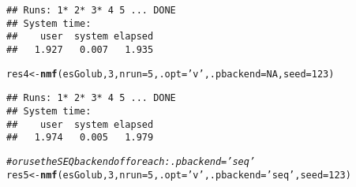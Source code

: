 \documentclass[a4paper]{article}\usepackage[]{graphicx}\usepackage[]{color}
\makeatletter
\newcommand{\hlnum}[1]{\textcolor[rgb]{0.686,0.059,0.569}{#1}}%
\newcommand{\hlstr}[1]{\textcolor[rgb]{0.192,0.494,0.8}{#1}}%
\newcommand{\hlcom}[1]{\textcolor[rgb]{0.678,0.584,0.686}{\textit{#1}}}%
\newcommand{\hlstd}[1]{\textcolor[rgb]{0.345,0.345,0.345}{#1}}%
\newcommand{\hlkwb}[1]{\textcolor[rgb]{0.69,0.353,0.396}{#1}}%
\newcommand{\hlkwc}[1]{\textcolor[rgb]{0.333,0.667,0.333}{#1}}%
\newcommand{\hlkwd}[1]{\textcolor[rgb]{0.737,0.353,0.396}{\textbf{#1}}}%
\newenvironment{kframe}{%
 \def\at@end@of@kframe{}%
 \ifinner\ifhmode%
  \def\at@end@of@kframe{\end{minipage}}%
  \begin{minipage}{\columnwidth}%
 \fi\fi%
 \def\FrameCommand##1{\hskip\@totalleftmargin \hskip-\fboxsep
 \colorbox{shadecolor}{##1}\hskip-\fboxsep
     \hskip-\linewidth \hskip-\@totalleftmargin \hskip\columnwidth}%
 \MakeFramed {\advance\hsize-\width
   \@totalleftmargin\z@ \linewidth\hsize
   \@setminipage}}%
 {\par\unskip\endMakeFramed%
 \at@end@of@kframe}
\newenvironment{knitrout}{}{} %
\makeatother
\begin{document}
\begin{knitrout}
\begin{kframe}
{\ttfamily\noindent\itshape\color{messagecolor}{\#\# NMF algorithm: 'brunet'\\\#\# Multiple runs: 5\\\#\# Mode: sequential [sapply]}}\begin{verbatim}
## Runs: 1* 2* 3* 4 5 ... DONE
## System time:
##    user  system elapsed 
##   1.927   0.007   1.935
\end{verbatim}
\begin{alltt}
\hlstd{res4} \hlkwb{<-} \hlkwd{nmf}\hlstd{(esGolub,} \hlnum{3}\hlstd{,} \hlkwc{nrun}\hlstd{=}\hlnum{5}\hlstd{,} \hlkwc{.opt}\hlstd{=}\hlstr{'v'}\hlstd{,} \hlkwc{.pbackend}\hlstd{=}\hlnum{NA}\hlstd{,} \hlkwc{seed}\hlstd{=}\hlnum{123}\hlstd{)}
\end{alltt}


{\ttfamily\noindent\itshape\color{messagecolor}{\#\# NMF algorithm: 'brunet'\\\#\# Multiple runs: 5\\\#\# Mode: sequential [sapply]}}\begin{verbatim}
## Runs: 1* 2* 3* 4 5 ... DONE
## System time:
##    user  system elapsed 
##   1.974   0.005   1.979
\end{verbatim}
\begin{alltt}
\hlcom{# or use the SEQ backend of foreach: .pbackend='seq'}
\hlstd{res5} \hlkwb{<-} \hlkwd{nmf}\hlstd{(esGolub,} \hlnum{3}\hlstd{,} \hlkwc{nrun}\hlstd{=}\hlnum{5}\hlstd{,} \hlkwc{.opt}\hlstd{=}\hlstr{'v'}\hlstd{,} \hlkwc{.pbackend}\hlstd{=}\hlstr{'seq'}\hlstd{,} \hlkwc{seed}\hlstd{=}\hlnum{123}\hlstd{)}
\end{alltt}



\end{kframe}
\end{knitrout}
\end{document}
